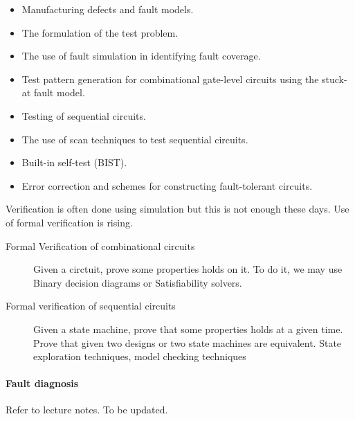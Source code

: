 \begin{itemize}

\item Manufacturing defects and fault models.  
\item The formulation of the test problem.  
\item The use of fault simulation in identifying fault coverage.  
\item Test pattern generation for combinational gate-level circuits using the
stuck-at fault model.  
\item Testing of sequential circuits.  
\item The use of scan techniques to test sequential circuits.  
\item Built-in self-test (BIST).  
\item Error correction and schemes for constructing fault-tolerant circuits. 
\end{itemize}

Verification is often done using simulation but this is not enough these days.
Use of formal verification is rising.
\begin{description}

\item[Formal Verification of combinational circuits] Given
a circtuit, prove some properties holds on it. To do it, we may use Binary decision diagrams
or Satisfiability solvers. 

\item [Formal verification of sequential circuits]  Given a state machine, prove
that some properties holds at a given time. Prove that given two designs or two
state machines are equivalent. State exploration techniques, model
checking techniques

\end{description}

\paragraph{Fault diagnosis}

  Refer to lecture notes. To be updated.

